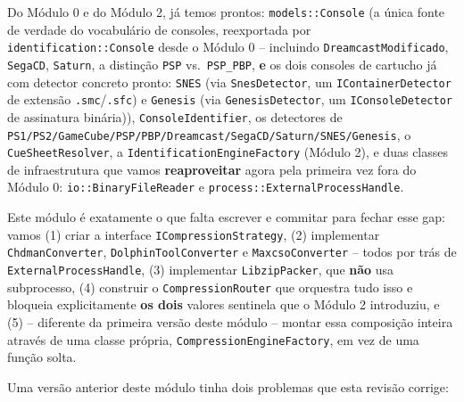 \begin{CaixaInfo}[title={O que já existe vs. o que este módulo constrói}]
Do Módulo 0 e do Módulo 2, já temos prontos: \texttt{models::Console} (a única fonte de verdade do vocabulário de consoles, reexportada por \texttt{identification::Console} desde o Módulo 0 -- incluindo \texttt{DreamcastModificado}, \texttt{SegaCD}, \texttt{Saturn}, a distinção \texttt{PSP} vs.\ \texttt{PSP\_PBP}, \textbf{e} os dois consoles de cartucho já com detector concreto pronto: \texttt{SNES} (via \texttt{SnesDetector}, um \texttt{IContainerDetector} de extensão \texttt{.smc}/\texttt{.sfc}) e \texttt{Genesis} (via \texttt{GenesisDetector}, um \texttt{IConsoleDetector} de assinatura binária)), \texttt{ConsoleIdentifier}, os detectores de \texttt{PS1/PS2/GameCube/PSP/PBP/Dreamcast/SegaCD/Saturn/SNES/Genesis}, o \texttt{CueSheetResolver}, a \texttt{IdentificationEngineFactory} (Módulo 2), e duas classes de infraestrutura que vamos \textbf{reaproveitar} agora pela primeira vez fora do Módulo 0: \texttt{io::BinaryFileReader} e \texttt{process::ExternalProcessHandle}.

Este módulo é exatamente o que falta escrever e commitar para fechar esse gap: vamos (1) criar a interface \texttt{ICompressionStrategy}, (2) implementar \texttt{ChdmanConverter}, \texttt{DolphinToolConverter} e \texttt{MaxcsoConverter} -- todos por trás de \texttt{ExternalProcessHandle}, (3) implementar \texttt{LibzipPacker}, que \textbf{não} usa subprocesso, (4) construir o \texttt{CompressionRouter} que orquestra tudo isso e bloqueia explicitamente \textbf{os dois} valores sentinela que o Módulo 2 introduziu, e (5) -- diferente da primeira versão deste módulo -- montar essa composição inteira através de uma classe própria, \texttt{CompressionEngineFactory}, em vez de uma função solta.

\begin{CaixaAlerta}[title={Duas correções em relação a uma versão anterior deste módulo}]
Uma versão anterior deste módulo tinha dois problemas que esta revisão corrige:


\end{CaixaAlerta}
\end{CaixaInfo}
